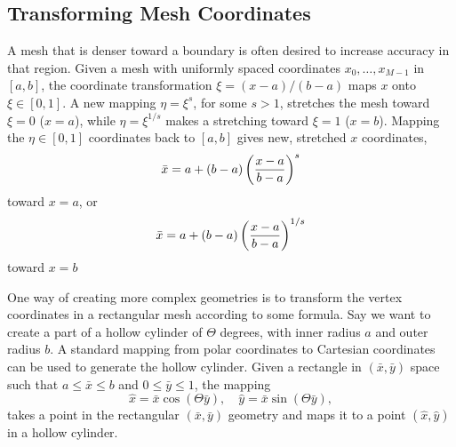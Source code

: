 \subsection{Transforming Mesh Coordinates}
\label{langtangen:mesh:transform:cyl}

A mesh that is denser toward a boundary is often desired to increase
accuracy in that region. Given a mesh with uniformly spaced
coordinates $x_0,\ldots,x_{M-1}$ in $[a,b]$, the coordinate transformation
$\xi = (x-a)/(b-a)$ maps $x$ onto $\xi\in [0,1]$. A new mapping
$\eta = \xi^s$, for some $s>1$, stretches the mesh toward $\xi=0$ ($x=a$),
while $\eta = \xi^{1/s}$ makes a stretching toward $\xi=1$ ($x=b$).
Mapping the $\eta\in[0,1]$ coordinates back to $[a,b]$ gives new,
stretched $x$ coordinates,
\begin{equation}
\bar x = a + (b-a)\left({x-a\over b-a}\right)^s
\end{equation}
toward $x=a$, or
\begin{equation}
\bar x = a + (b-a)\left({x-a\over b-a}\right)^{1/s}
\end{equation}
toward $x=b$

One way of creating more complex geometries is to transform the
vertex coordinates in a rectangular mesh according to some formula.
Say we want to create a part of a hollow cylinder of $\Theta$ degrees,
with inner radius $a$ and outer radius $b$. A standard mapping from polar
coordinates to Cartesian coordinates can be used to generate the
hollow cylinder. Given a rectangle in $(\bar x, \bar y)$ space such that
$a\leq \bar x\leq b$ and $0\leq \bar y\leq 1$, the mapping
\[ \hat x = \bar x\cos (\Theta \bar y),\quad \hat y = \bar x\sin (\Theta \bar y),\]
takes a point in the rectangular $(\bar x,\bar y)$
geometry and maps it to a point
$(\hat x, \hat y)$ in a hollow cylinder.

